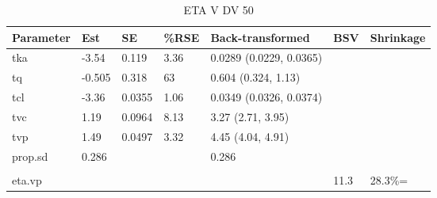 \begin{table}
\centering\centering
\caption{ETA V DV 50}
\centering
\fontsize{8}{10}\selectfont
\begin{tabular}[t]{lllllll}
\toprule
\textbf{Parameter} & \textbf{Est} & \textbf{SE} & \textbf{\%RSE} & \textbf{Back-transformed} & \textbf{BSV} & \textbf{Shrinkage}\\
\midrule
tka & -3.54 & 0.119 & 3.36 & 0.0289 (0.0229, 0.0365) &  & \\
\midrule
tq & -0.505 & 0.318 & 63 & 0.604 (0.324, 1.13) &  & \\
\midrule
tcl & -3.36 & 0.0355 & 1.06 & 0.0349 (0.0326, 0.0374) &  & \\
\midrule
tvc & 1.19 & 0.0964 & 8.13 & 3.27 (2.71, 3.95) &  & \\
\midrule
tvp & 1.49 & 0.0497 & 3.32 & 4.45 (4.04, 4.91) &  & \\
\midrule
prop.sd & 0.286 &  &  & 0.286 &  & \\
\midrule\\
eta.vp &  &  &  &  & 11.3 & 28.3\%=\\
\bottomrule
\end{tabular}
\end{table}